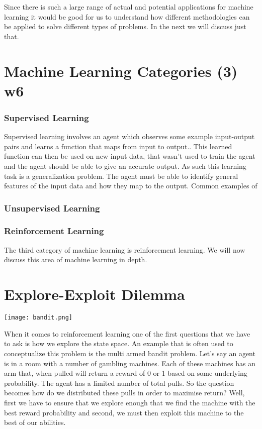 Since there is such a large range of actual and potential applications for machine learning it would be good for
us to understand how different methodologies can be applied to solve different types of problems.
In the next we will discuss just that.


\section{Machine Learning Categories (3) w6}\label{sec:mlCategories}

\subsubsection{Supervised Learning}
Supervised learning involves an agent which observes some example input-output pairs and learns
a function that maps from input to output.\cite{russell2016artificial}.
This learned function can then be used on new input data, that wasn't used to train the agent and the
agent should be able to give an accurate output.
As such this learning task is a generalization problem.
The agent must be able to identify general features of the input data and how they map to the output.
Common examples of 


\subsubsection{Unsupervised Learning}
\subsubsection{Reinforcement Learning}
The third category of machine learning is reinforcement learning.
We will now discuss this area of machine learning in depth.

\section{Explore-Exploit Dilemma}\label{sec:exploreExploit}
\begin{center}
    \texttt{[image: bandit.png]}
\end{center}
When it comes to reinforcement learning one of the first questions that we have to ask is how we explore
the state space.
An example that is often used to conceptualize this problem is the multi armed bandit problem.
Let's say an agent is in a room with a number of gambling machines.
Each of these machines has an arm that, when pulled will return a reward of 0 or 1 based on some underlying
probability\cite{kaelbling1996reinforcement}.
The agent has a limited number of total pulls.
So the question becomes how do we distributed these pulls in order to maximise return?
Well, first we have to ensure that we explore enough that we find the machine with the best reward probability
and second, we must then exploit this machine to the best of our abilities.

